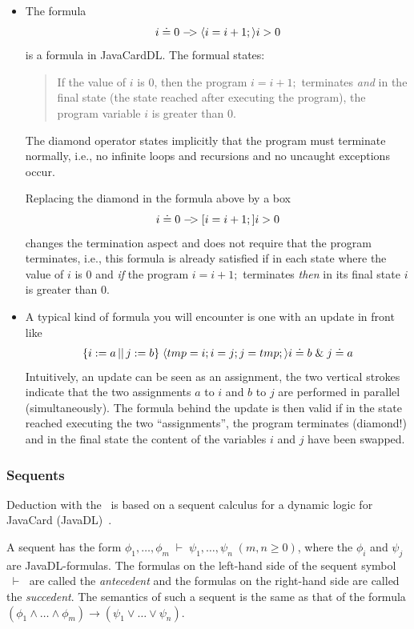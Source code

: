\begin{itemize}
\item The formula \[
  i \doteq 0 \mathrel{-\!\!\!>} \langle i = i + 1;\rangle{i \ensuremath{>}0}
  \] is a formula in JavaCardDL. The formual states:

  \begin{quote}
    If the value of $i$ is $0$, then the program $i = i + 1;$ terminates
    \emph{and} in the final state (the state reached after executing the
    program), the program variable $i$ is greater than $0$.
  \end{quote}

  The diamond operator states implicitly that the program must
  terminate normally, i.e., no infinite loops and recursions and no uncaught
  exceptions occur.

  Replacing the diamond in the formula above by a box \[
     i \doteq 0 \mathrel{-\!\!\!>} [i = i + 1;]{i \ensuremath{>}0}
  \]
  changes the termination aspect and does not require that the program
  terminates, i.e., this formula is already satisfied if in each state
  where the value of $i$ is $0$ and \emph{if} the program $i = i + 1;$
  terminates \emph{then} in its final state $i$ is greater than $0$.

\item A typical kind of formula you will encounter is one with an update
  in front like \[ 
      \{i := a \,||\, j := b\}\;\langle tmp = i; i =
          j; j = tmp;\rangle{i \ensuremath{\doteq}b \ensuremath{\mathrel{\&}}j \ensuremath{\doteq}a}
  \] Intuitively, an update can be seen as an assignment, the two
  vertical strokes indicate that the two assignments $a$ to $i$ and
  $b$ to $j$ are performed in parallel (simultaneously). The formula
  behind the update is then valid if in the state reached executing
  the two ``assignments'', the program terminates (diamond!) and
  in the final state the content of the variables $i$ and $j$ have
  been swapped.
\end{itemize}

\subsubsection{Sequents}
\label{sec:sequents}

Deduction with the \kp\ is based on a sequent calculus for a dynamic
logic for JavaCard (JavaDL)~\cite{KeYBook2007,Beckert01}.

A sequent
has the form $\phi_1, \ldots,\phi_m\;\vdash\;\psi_1,\ldots,\psi_n\;
(m,n \geq 0)$, where the $\phi_i$ and $\psi_j$ are JavaDL-formulas.
The formulas on the left-hand side of the sequent symbol $\;\vdash\;$
are called the {\it antecedent} and the formulas on the right-hand side
are called the {\it succedent}. The semantics of such a sequent is the same as
that of the formula $(\phi_1\land\ldots\land \phi_m) \to (\psi_1
\lor\ldots\lor \psi_n)$.

